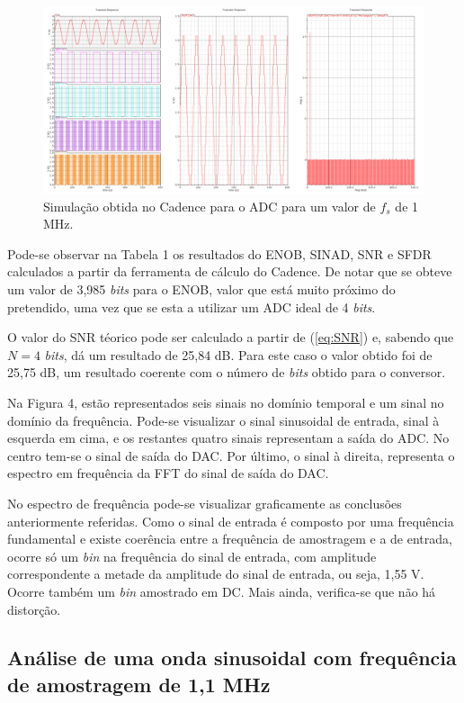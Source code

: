 \documentclass[11pt]{article}
\numberwithin{equation}{section}
\begin{document}
\begin{figure}[H]
	\centering
	\includegraphics[keepaspectratio=true, scale=0.32]{lab/f_fft_1M.png}
	\caption{Simulação obtida no Cadence para o ADC para um valor de $f_{s}$ de 1 MHz.}
	\vspace{-0.8em}
\end{figure}
	 
Pode-se observar na Tabela 1 os resultados do ENOB, SINAD, SNR e SFDR calculados a partir da ferramenta de cálculo do Cadence. De notar que se obteve um valor de 3,985 \textit{bits} para o ENOB, valor que está muito próximo do pretendido, uma vez que se esta a utilizar um ADC ideal de 4 \textit{bits}.

O valor do SNR téorico pode ser calculado a partir de (\ref{eq:SNR}) e, sabendo que $N = 4$ \textit{bits}, dá um resultado de 25,84 dB. Para este caso o valor obtido foi de 25,75 dB, um resultado coerente com o número de \textit{bits} obtido para o conversor. 	 
	 
Na Figura 4, estão representados seis sinais no domínio temporal e um sinal no domínio da frequência. Pode-se visualizar o sinal sinusoidal de entrada, sinal à esquerda em cima, e os restantes quatro sinais representam a saída do ADC. No centro tem-se o sinal de saída do DAC. Por último, o sinal à direita, representa o espectro em frequência da FFT do sinal de saída do DAC.

No espectro de frequência pode-se visualizar graficamente as conclusões anteriormente referidas. Como o sinal de entrada é composto por uma frequência fundamental e existe coerência entre a frequência de amostragem e a de entrada, ocorre só um \textit{bin} na frequência do sinal de entrada, com amplitude correspondente a metade da amplitude do sinal de entrada, ou seja, 1,55 V. Ocorre também um \textit{bin} amostrado em DC. Mais ainda, verifica-se que não há distorção.

\subsection{Análise de uma onda sinusoidal com frequência de amostragem de 1,1 MHz}
\end{document}

